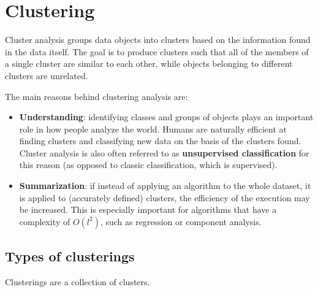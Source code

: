 \chapter{Clustering}

Cluster analysis groups data objects into clusters based on the information found in the data itself. The goal is to produce clusters such that all of the members of a single cluster are similar to each other, while objects belonging to different clusters are unrelated.

The main reasons behind clustering analysis are:

\begin{itemize}
    \item \textbf{Understanding}: identifying classes and groups of objects plays an important role in how people analyze the world. Humans are naturally efficient at finding clusters and classifying new data on the basis of the clusters found. Cluster analysis is also often referred to as \textbf{unsupervised classification} for this reason (as opposed to classic classification, which is supervised).

    \item \textbf{Summarization}: if instead of applying an algorithm to the whole dataset, it is applied to (accurately defined) clusters, the efficiency of the execution may be increased. This is especially important for algorithms that have a complexity of $O(l^2)$, such as regression or component analysis.
\end{itemize}

\section{Types of clusterings}

Clusterings are a collection of clusters.

